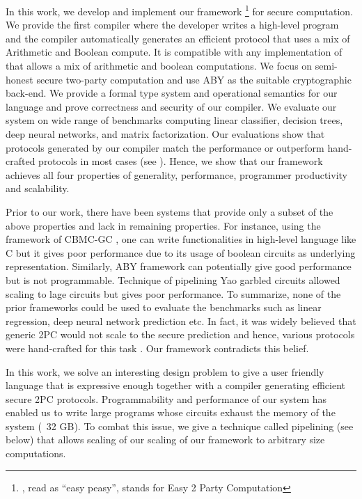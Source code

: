 In this work, we develop and implement our framework \tool\footnote{\tool, read as ``easy peasy'', stands for Easy 2 Party Computation} for secure
computation. We provide the first compiler where the developer writes a high-level program and the compiler automatically generates an efficient \mpc protocol that uses a
mix of Arithmetic and Boolean compute. 
It is compatible with any implementation of \mpc that allows a mix of arithmetic and boolean computations. 
We focus on semi-honest secure two-party computation and use ABY \cite{aby} as the suitable cryptographic back-end.
We provide a formal type system and operational semantics for our language and prove correctness and security of our compiler.
We evaluate our system on wide range of benchmarks \cite{shafindss,wu,minionn,valeriaMatrix} computing linear classifier, decision trees, deep neural networks, and matrix factorization. Our evaluations show that protocols generated by our compiler match
the performance or outperform hand-crafted protocols in most cases (see
). 
Hence, we show that our framework achieves all four properties of generality, performance, programmer productivity and scalability. 

Prior to our work, there have been systems that provide only a subset of the above properties and lack in remaining properties. For instance, using the framework of CBMC-GC \cite{cbmcgc}, one can write functionalities in high-level language like C but it gives poor performance due to its usage of boolean circuits as underlying representation. Similarly, ABY framework can potentially give good performance but is not programmable. Technique of pipelining Yao garbled circuits \cite{yao-pipe} allowed scaling to lage circuits but gives poor performance.  To summarize, none of the prior frameworks could be used to evaluate the benchmarks such as linear regression, deep neural network prediction etc. In fact, it was widely believed that generic 2PC would not scale to the secure prediction and hence, various protocols were hand-crafted for this task \cite{shafindss,wu,secureml,minionn}. Our framework contradicts this belief.

In this work, we solve an interesting design problem to give a user friendly language that is expressive enough together with a compiler generating efficient secure 2PC protocols.
Programmability and performance of our system has enabled us to write large programs whose circuits  exhaust the memory of the system (~32 GB). To combat this issue, we give a technique called pipelining (see below) that allows scaling of our  scaling of our framework to arbitrary size computations.


